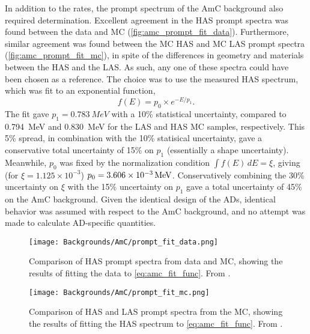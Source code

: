 \documentclass[../thesis.tex]{subfiles}
\begin{document}
In addition to the rates, the prompt spectrum of the AmC background also required determination. Excellent agreement in the HAS prompt spectra was found between the data and MC (\autoref{fig:amc_prompt_fit_data}). Furthermore, similar agreement was found between the MC HAS and MC LAS prompt spectra (\autoref{fig:amc_prompt_fit_mc}), in spite of the differences in geometry and materials between the HAS and the LAS. As such, any one of these spectra could have been chosen as a reference. The choice was to use the measured HAS spectrum, which was fit to an exponential function,
\begin{equation}
  f(E) = p_0 \times e^{-E/p_1}.
  \label{eq:amc_fit_func}
\end{equation}
The fit gave $p_1 = \SI{0.783}{MeV}$ with a 10\% statistical uncertainty, compared to \SI{0.794}{MeV} and \SI{0.830}{MeV} for the LAS and HAS MC samples, respectively. This 5\% spread, in combination with the 10\% statisical uncertainty, gave a conservative total uncertainty of 15\% on $p_1$ (essentially a shape uncertainty). Meanwhile, $p_0$ was fixed by the normalization condition $\int f(E)\,dE = \xi$, giving (for $\xi = 1.125\times10^{-3}$) $p_0 = \SI[parse-numbers = false]{3.606\times10^{-3}}{/MeV}$. Conservatively combining the 30\% uncertainty on $\xi$ with the 15\% uncertainty on $p_1$ gave a total uncertainty of 45\% on the AmC background. Given the identical design of the ADs, identical behavior was assumed with respect to the AmC background, and no attempt was made to calculate AD-specific quantities.

\begin{figure}[ht]
  \texttt{[image: Backgrounds/AmC/prompt\_fit\_data.png]}
  \caption{Comparison of HAS prompt spectra from data and MC, showing the results of fitting the data to \autoref{eq:amc_fit_func}. From \cite{Gu_2016}.}
  \label{fig:amc_prompt_fit_data}
\end{figure}

\begin{figure}[ht]
  \texttt{[image: Backgrounds/AmC/prompt\_fit\_mc.png]}
  \caption{Comparison of HAS and LAS prompt spectra from the MC, showing the results of fitting the HAS spectrum to \autoref{eq:amc_fit_func}. From \cite{Gu_2016}.}
  \label{fig:amc_prompt_fit_mc}
\end{figure}
\end{document}
